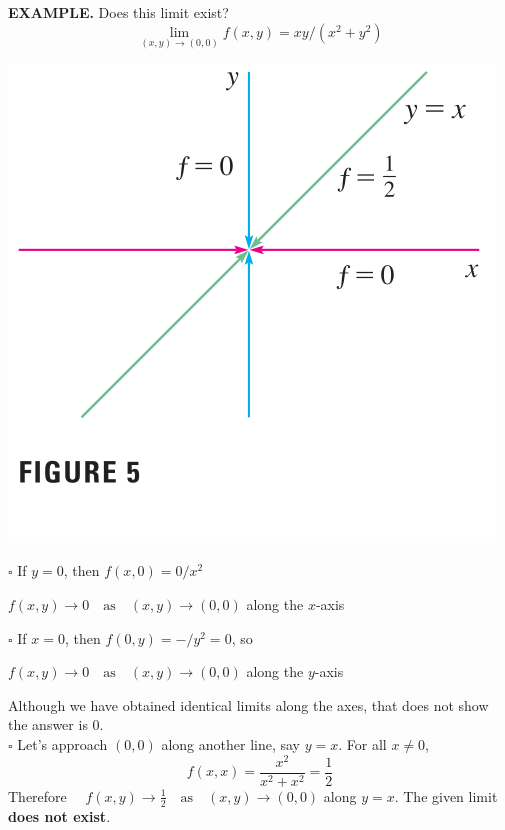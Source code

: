 \documentclass{article}
\begin{document}
  {\selectfont \textbf{\textcolor{blue5}{EXAMPLE.}}} Does this limit exist?
  \[\lim_{(x,y) \to (0,0)} f(x,y) = xy/(x^2 + y^2 )\]

    \begin{minipage}[]{0.37\linewidth}
      \begin{center}
        \includegraphics[width = 5 cm]{./images/lim3g2.png} 
      \end{center}
    \end{minipage}
  \begin{minipage}[]{0.6\linewidth}
    $\square$ If $y = 0$, then $f(x,0) = 0/ x^2 $
    \begin{center}
      $f(x,y) \to 0 \quad \text{as} \quad (x,y) \to (0,0)$ along the $x$-axis
    \end{center}
    $\square$ If $x = 0$, then $f(0,y) = -/ y^2 = 0$, so 
    \begin{center}
      $f(x,y) \to 0 \quad \text{as} \quad (x,y) \to (0,0)$ along the $y$-axis
    \end{center}
  \end{minipage}
Although we have obtained identical limits along the axes, that does not show the answer is 0.  \\
$\square$ Let's approach $(0,0)$ along another line, say $y = x$. For all $x \ne 0$,
\[f(x,x) = \frac{x^2 }{x^2 + x^2 } = \frac{1}{2}\]
Therefore $\quad f(x,y) \to \frac{1 }{2 } \quad \text{as} \quad (x,y) \to (0,0)$  along $y = x$. The given limit \textbf{does not exist}. 
\end{document}
